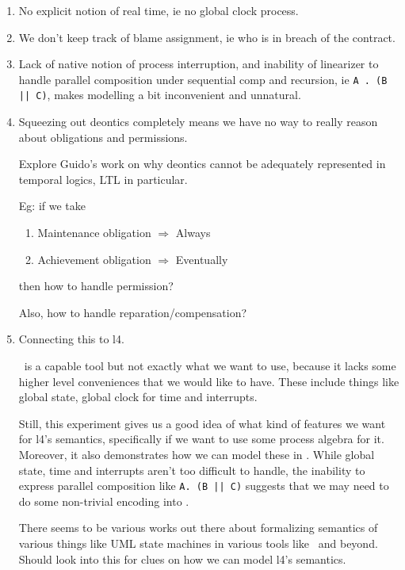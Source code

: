 \documentclass{article}
\begin{document}
\begin{enumerate}
  \item No explicit notion of real time, ie no global clock process.

  \item We don't keep track of blame assignment, ie who is in breach of the
  contract.

  \item Lack of native notion of process interruption, and inability of
  linearizer to handle parallel composition under sequential comp and recursion,
  ie \texttt{A . (B || C)}, makes modelling a bit inconvenient and unnatural.

  \item Squeezing out deontics completely means we have no way to really reason
  about obligations and permissions.

  Explore Guido's work on why deontics cannot be adequately represented in
  temporal logics, LTL in particular.

  Eg: if we take
  \begin{enumerate}
    \item Maintenance obligation $\Rightarrow$ Always
    \item Achievement obligation $\Rightarrow$ Eventually
  \end{enumerate}
  then how to handle permission?

  Also, how to handle reparation/compensation?

  \item Connecting this to l4.
  
  \mcrl \, is a capable tool but not exactly what we want to use, because it
  lacks some higher level conveniences that we would like to have.
  These include things like global state, global clock for time and interrupts.

  Still, this experiment gives us a good idea of what kind of features we want
  for l4's semantics, specifically if we want to use some process algebra for
  it.
  Moreover, it also demonstrates how we can model these in \mcrl.
  While global state, time and interrupts aren't too difficult to handle, the
  inability to express parallel composition like \texttt{A. (B || C)} suggests
  that we may need to do some non-trivial encoding into \mcrl.

  There seems to be various works out there about formalizing semantics of
  various things like UML state machines in various tools like \mcrl \, and
  beyond.
  Should look into this for clues on how we can model l4's semantics.
\end{enumerate}
\end{document}
